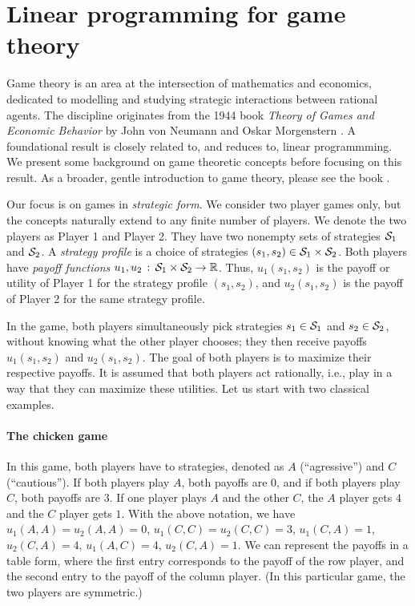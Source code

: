 \documentclass[12pt, showidx, twoside]{article}
\let\oldsection\section
\def\section{\cleardoublepage\oldsection}
\begin{document}
{{{\section{Linear programming for game theory}

Game theory is an area at the intersection of mathematics and economics, dedicated to modelling and studying strategic interactions between rational agents. The discipline originates from the 1944 book \emph{Theory of Games and Economic Behavior} by John von Neumann and Oskar Morgenstern \cite{neumann}. A foundational result is closely related to, and reduces to, linear programmming. We present some background on game theoretic concepts before focusing on this result.
As a broader, gentle introduction to game theory, please see the book \cite{Stengel2021game}.

Our focus is on games in \emph{strategic form}. We consider two player games only, but the concepts naturally extend to any finite number of players. We denote the two players as Player 1 and Player 2. They have two nonempty sets of strategies ${\cal S}_1$ and ${\cal S}_2$. A \emph{strategy profile} is a choice of strategies $(s_1,s_2)\in {\cal S}_1\times {\cal S}_2$. Both players have \emph{payoff functions} $u_1,u_2\,:\,{\cal S}_1\times {\cal S}_2\to \mathbb{R}$. Thus, $u_1(s_1,s_2)$ is the payoff or utility of Player 1 for the strategy profile $(s_1,s_2)$, and $u_2(s_1,s_2)$ is the payoff of Player 2 for the same strategy profile.

In the game, both players simultaneously pick strategies $s_1\in {\cal S}_1$ and $s_2\in {\cal S}_2$, without knowing what the other player chooses; they then receive payoffs $u_1(s_1,s_2)$ and $u_2(s_1,s_2)$. The goal of both players is to maximize their respective payoffs. It is assumed that both players act rationally, i.e., play in a way that they can maximize these utilities. 
Let us start with two classical examples. 

\paragraph{The chicken game} In this game, both players have to strategies, denoted as $A$ (``agressive'') and $C$ (``cautious''). If both players play $A$, both payoffs are $0$, and if both players play $C$, both payoffs are $3$. If one player plays $A$ and the other $C$, the $A$ player gets $4$ and the $C$ player gets $1$. With the above notation, we have $u_1(A,A)=u_2(A,A)=0$, $u_1(C,C)=u_2(C,C)=3$, $u_1(C,A)=1$, $u_2(C,A)=4$, $u_1(A,C)=4$, $u_2(C,A)=1$. We can represent the payoffs in a table form, where the first entry corresponds to the payoff of the row player, and the second entry to the payoff of the column player. (In this particular game, the two players are symmetric.)

}}}
\end{document}
